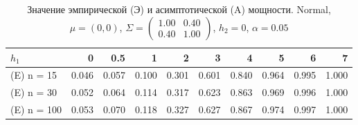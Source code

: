 \begin{table}[ht]
\centering
\caption{Значение эмпирической (Э) и асимптотической (A) мощности. Normal, $\mu = (0, 0)$, $\Sigma = \begin{pmatrix}
1.00 & 0.40 \\
0.40 & 1.00
\end{pmatrix}$, $h_2 = 0$, $\alpha = 0.05$} 
\label{tab:power_table}
\begin{tabular}{lrrrrrrrrr}
  \hline
$h_{1}$ & 0 & 0.5 & 1 & 2 & 3 & 4 & 5 & 6 & 7 \\ 
  \hline
(E) n = 15 & 0.046 & 0.057 & 0.100 & 0.301 & 0.601 & 0.840 & 0.964 & 0.995 & 1.000 \\ 
  (E) n = 30 & 0.052 & 0.064 & 0.114 & 0.317 & 0.623 & 0.863 & 0.969 & 0.996 & 1.000 \\ 
  (E) n = 100 & 0.053 & 0.070 & 0.118 & 0.327 & 0.627 & 0.867 & 0.974 & 0.997 & 1.000 \\ 
   \hline
\end{tabular}
\end{table}
